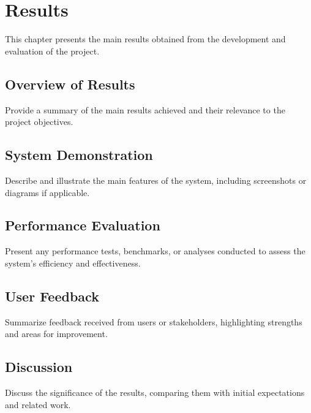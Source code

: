 
\chapter{Results}\label{cap:results}
This chapter presents the main results obtained from the development and evaluation of the project.

\section{Overview of Results}
Provide a summary of the main results achieved and their relevance to the project objectives.

\section{System Demonstration}
Describe and illustrate the main features of the system, including screenshots or diagrams if applicable.

\section{Performance Evaluation}
Present any performance tests, benchmarks, or analyses conducted to assess the system's efficiency and effectiveness.

\section{User Feedback}
Summarize feedback received from users or stakeholders, highlighting strengths and areas for improvement.

\section{Discussion}
Discuss the significance of the results, comparing them with initial expectations and related work.
